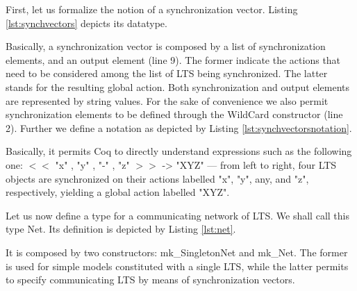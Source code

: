 		First, let us formalize the notion of a synchronization vector. Listing \ref{lst:synchvectors}
	depicts its datatype.	
	
			

	\noindent Basically, a synchronization vector is composed by a list of synchronization elements,
	and an output element (line 9). The former indicate the \textsf{actions} that need to be considered among
	the list of \ac{LTS} being synchronized. The latter stands for the resulting global action.  
	Both synchronization and output elements are represented by string values. For the sake of convenience
	we also permit synchronization elements to be defined through the \textsf{WildCard} constructor (line 2).
	Further we define a notation as depicted by Listing \ref{lst:synchvectorsnotation}.
	
		
                      	
    \noindent Basically, it permits Coq to directly understand expressions such 
    as the following one: \textsf{$<<$ "x" , "y" , "-" , "z" $>>$ -> "XYZ"} --- from left to right,
    four \textsf{LTS} objects are synchronized on their \textsf{actions} labelled \textsf{"x"}, \textsf{"y"}, any,
    and \textsf{"z"}, respectively, yielding a global \textsf{action} labelled \textsf{"XYZ"}.

	Let us now define a type for a communicating network of \ac{LTS}. We shall call this type \textsf{Net}.
	Its definition is depicted by Listing \ref{lst:net}.	

		

	\noindent It is composed by two constructors: \textsf{mk\_SingletonNet} and \textsf{mk\_Net}.
	The former is used for simple models constituted with a single \ac{LTS}, while the latter
	permits to specify communicating \ac{LTS} by means of synchronization vectors.
	
